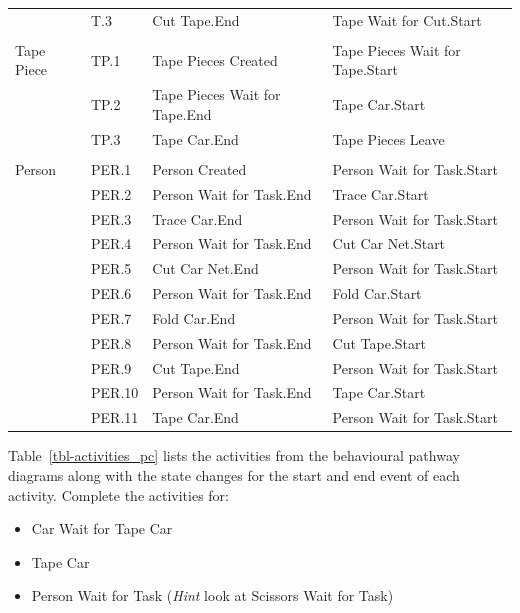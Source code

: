 \documentclass[
  10pt,
  a4paperpaper,
  DIV=11,
  numbers=noendperiod,
  oneside]{scrreprt}
\providecommand{\tightlist}{%
  \setlength{\itemsep}{0pt}\setlength{\parskip}{0pt}}\usepackage{longtable,booktabs,array}
\begin{document}
\begin{longtable}{p{2.4cm}>{\raggedright\arraybackslash}p{1.2cm}>{\raggedright\arraybackslash}p{5.9cm}>{\raggedright\arraybackslash}p{5.9cm}}
       & T.3 & Cut Tape.End & Tape Wait for Cut.Start \\
       &      &              &              \\
Tape Piece & TP.1 & Tape Pieces Created & Tape Pieces Wait for Tape.Start \\
           & TP.2 & Tape Pieces Wait for Tape.End & Tape Car.Start \\
           & TP.3 & Tape Car.End & Tape Pieces Leave \\
     &      &              &              \\
Person & PER.1 & Person Created & Person Wait for Task.Start \\
       & PER.2 & Person Wait for Task.End & Trace Car.Start \\
       & PER.3 & Trace Car.End & Person Wait for Task.Start \\
       & PER.4 & Person Wait for Task.End & Cut Car Net.Start \\
       & PER.5 & Cut Car Net.End & Person Wait for Task.Start \\
       & PER.6 & Person Wait for Task.End & Fold Car.Start \\
       & PER.7 & Fold Car.End & Person Wait for Task.Start \\
       & PER.8 & Person Wait for Task.End & Cut Tape.Start \\
       & PER.9 & Cut Tape.End & Person Wait for Task.Start \\
       & PER.10 & Person Wait for Task.End & Tape Car.Start \\
       & PER.11 & Tape Car.End & Person Wait for Task.Start \\\bottomrule

\end{longtable}

Table~\ref{tbl-activities_pc} lists the activities from the behavioural
pathway diagrams along with the state changes for the start and end
event of each activity. Complete the activities for:

\begin{itemize}
\tightlist
\item
  Car Wait for Tape Car
\item
  Tape Car
\item
  Person Wait for Task (\emph{Hint} look at Scissors Wait for Task)
\end{itemize}
\end{document}
